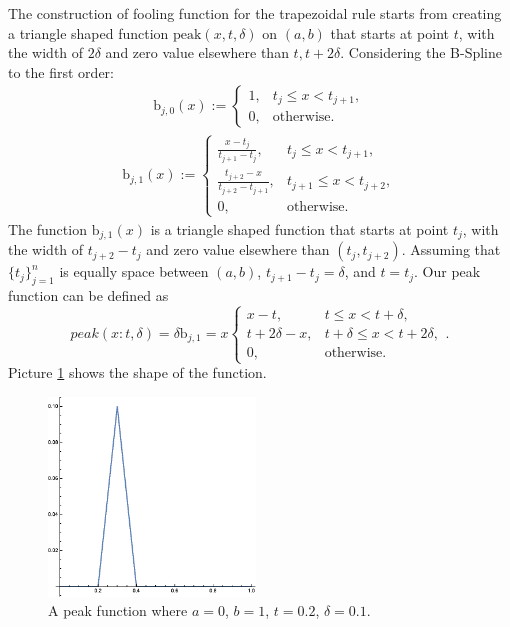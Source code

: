 \documentclass{iitthesis}
\theoremstyle{definition}
\theoremstyle{remark}
\begin{document}
The construction of fooling function for the trapezoidal rule starts from creating a triangle shaped function $\text{peak}(x,t,\delta)$ on $(a,b)$ that starts at point $t$, with the width of $2\delta$ and zero value elsewhere than $t, t+2\delta$. Considering the B-Spline to the first order:
\begin{align*}
  \text{b}_{j,0}(x):= \begin{cases} \displaystyle 1, & t_{j} \le x < t_{j+1},\\[1ex]
\displaystyle  0, & \text{otherwise}.
\end{cases}
\end{align*}
\begin{align*}
  \text{b}_{j,1}(x):= \begin{cases} \displaystyle \frac{x-t_{j}}{t_{j+1}-t_{j}}, & t_{j} \le x < t_{j+1},\\[1ex]
\displaystyle \frac{t_{j+2}-x}{t_{j+2}-t_{j+1}}, & t_{j+1} \le x < t_{j+2},\\[1ex]
\displaystyle  0, & \text{otherwise}.
\end{cases}
\end{align*}
The function $\text{b}_{j,1}(x)$ is a triangle shaped function that starts at point $t_j$, with the width of $t_{j+2}-t_{j}$ and zero value elsewhere than $(t_{j}, t_{j+2})$. Assuming that $\{t_{j}\}_{j=1}^{n}$ is equally space between $(a,b)$, $t_{j+1}-t_{j}=\delta$, and $t=t_{j}$. Our peak function can be defined as
\begin{equation}\label{peakfunction}
  peak(x:t,\delta)=\delta \text{b}_{j,1}=x\begin{cases} \displaystyle x-t, & t \le x < t+\delta,\\[1ex]
\displaystyle t+2\delta-x, & t+\delta \le x < t+2\delta,\\[1ex]
\displaystyle  0, & \text{otherwise}.
\end{cases}.
\end{equation}
Picture \ref{fig:peakfunction} shows the shape of the function.
\begin{figure}[h]
\centering
\includegraphics[width=5.5cm]{peak.eps}
\caption{A peak function where $a=0$, $b=1$, $t=0.2$, $\delta=0.1$. \label{fig:peakfunction}}
\end{figure}
\end{document}
